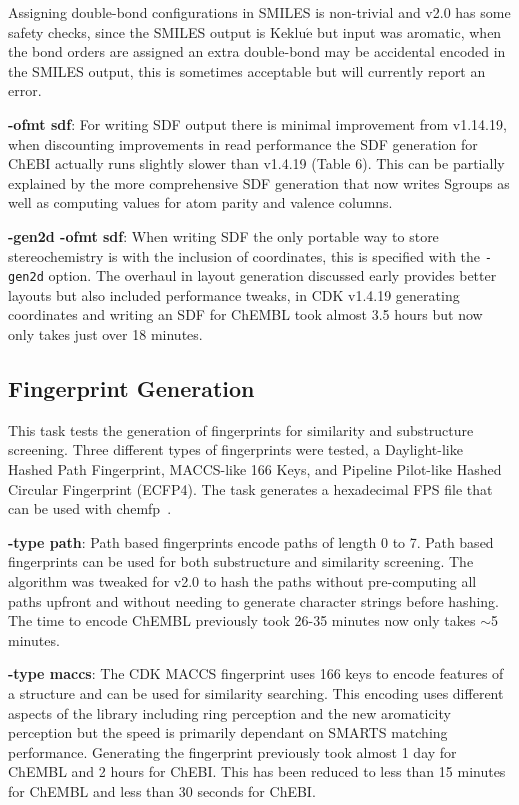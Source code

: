 \documentclass[doublespacing]{bmcart}
\def \cdkversion {v2.0}
\begin{document}
Assigning double-bond configurations in SMILES is 
non-trivial and \cdkversion{} has some safety checks, since the SMILES output is 
Keklu$\mathrm{\acute{e}}$ but input was aromatic, when the bond orders are 
assigned an extra double-bond may be accidental encoded in the SMILES output, 
this is sometimes acceptable but will currently report an error.

\textbf{-ofmt sdf}: For writing SDF output there is minimal improvement from v1.14.19, when 
discounting improvements in read performance the SDF generation for ChEBI 
actually runs slightly slower than v1.4.19 (Table 6). This can be partially 
explained by the more comprehensive SDF generation that now writes Sgroups 
as well as computing values for atom parity and valence columns.

\textbf{-gen2d -ofmt sdf}: When writing SDF the only portable way to store stereochemistry is with the 
inclusion of coordinates, this is specified with the \texttt{-gen2d} option. 
The overhaul in layout generation discussed early provides better layouts but 
also included performance tweaks, in CDK v1.4.19 generating coordinates and 
writing an SDF for ChEMBL took almost 3.5 hours but now only takes just over
18 minutes.

\subsection*{Fingerprint Generation}

This task tests the generation of fingerprints for similarity and substructure
screening. Three different types of fingerprints were tested, a Daylight-like 
Hashed Path Fingerprint, MACCS-like 166 Keys, and Pipeline Pilot-like Hashed 
Circular Fingerprint (ECFP4). The task generates a hexadecimal FPS file that
can be used with chemfp~\cite{Dalke2013}.

\textbf{-type path}: Path based fingerprints encode paths of length 0 to 7. Path
based fingerprints can be used for both substructure and similarity screening. 
The algorithm was tweaked for \cdkversion{} to hash the paths without 
pre-computing all paths upfront and without needing to generate character 
strings before hashing. The time to encode ChEMBL previously took 26-35 minutes 
now only takes $\sim$5 minutes.

\textbf{-type maccs}: The CDK MACCS fingerprint uses 166 keys to encode
features of a structure and can be used for similarity searching. This encoding
uses different aspects of the library including ring perception and the new
aromaticity perception but the speed is primarily dependant on SMARTS matching 
performance. Generating the fingerprint previously took almost 1 day for ChEMBL 
and 2 hours for ChEBI. This has been reduced to less than 
15 minutes for ChEMBL and less than 30 seconds for ChEBI. 
\end{document}
